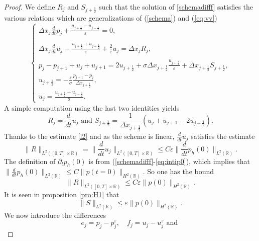 \documentclass[a4paper,french,english,10pt]{article}
\newcommand\eps{\varepsilon}
\newcommand{\dt}{\partial_t}
\begin{document}
\begin{proof}
We define $R_j$ and $S_{j+\frac12 }$ such that the solution of
\eqref{schemadifff} satisfies the various relations 
which are generalizations of (\ref{schema}) and (\ref{eq:vv}) 
 \begin{equation}\label{schemadiff3}
\left\{
\begin{array}{lll}
\displaystyle 
\Delta x_j\frac{d}{dt} p_j
+\frac{u_{j+\frac12 }-u_{j-\frac12 }}{\eps }=0,\\
\\
\displaystyle 
\Delta x_j\frac{d}{dt} u_j
-\frac{u_{j+\frac12 }+u_{j-\frac12 }}{\eps}+\frac{2}{\eps }u_j=\Delta x_j R_j,\\
\\
\displaystyle 
p_j-p_{j+1}+u_j+u_{j+1} =2u_{j+\frac12 } +\sigma \Delta x_{j+\frac12 }
\frac{u_{j+\frac12 } }{\eps}+\Delta x_{j+\frac12}S_{j+\frac12 } , \\
\displaystyle 
u_{j+\frac12}= -\frac\eps\sigma \frac{p_{j+1}-p_j}{\Delta x_{j+\frac12}}, \\
\displaystyle 
u_j=\frac{u_{j+\frac12}+u_{j-\frac12}}{2}.
\end{array}
\right.
\end{equation}
A simple computation using the  last two identities
yields
\begin{equation*}
R_j= \frac{d}{dt} u_j
\mbox{ and }
S_{j+\frac12 }= \frac1{\Delta x_{j+\frac12} }\left(
u_j+u_{j+1} -2u_{j+\frac12 }\right).
\end{equation*}
Thanks to the estimate \eqref{l2} and as the scheme is linear, $\frac{d}{dt} u_j$
satisfies the estimate 
$$
\|R\|_{L^2([0,T]\times \mathbb{R})}=\bigg\|\frac{d}{dt} u_j\bigg\|_{L^2([0,T]\times \mathbb{R})}\leq
C\eps\bigg\|\frac{d}{dt} p_h(0)\bigg\|_{L^2(\mathbb{R})}.
$$
The definition of $\dt p_h(0)$ is from (\ref{schemadifff}-\ref{eq:intip0}),
which
implies that $\|\frac{d}{dt} p_h(0)\|_{L^2(\mathbb{R})}\leq C 
\| p(t=0)\|_{H^2(\mathbb{R})}$. So one has the bound
\begin{equation} \label{eq:p5}
\|R\|_{L^2([0,T]\times \mathbb{R})}\leq C \eps
\| p(0)\|_{H^2(\mathbb{R})}.
\end{equation}
It is seen in proposition \ref{pro:H1}
that 
\begin{equation}\label{eq:xx}
\| S\|_{L^2(\mathbb{R})} \leq \eps  
\| p(0)\|_{H^2(\mathbb{R})}.
\end{equation}
We now introduce the differences
\begin{equation*}
e_j= p_j-p_{j}^{\eps} ,\quad
f_j = u_j-u_j^{\eps} \mbox{ and }

\end{equation*}
\end{proof}
\end{document}
